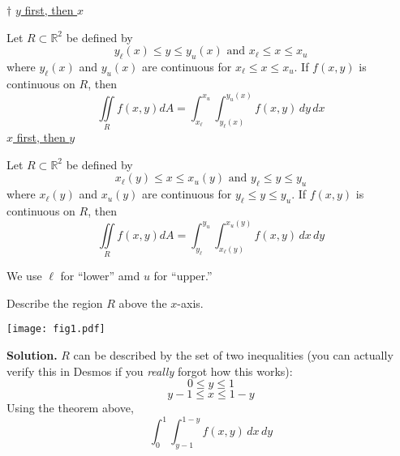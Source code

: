 \begin{Theorem}{$ \dagger $}{}
    \underline{$ y $ first, then $ x $}

    Let $ R\subset \mathbb{R}^2 $ be defined by
    \[ y_\ell(x)\leqslant y\leqslant y_u(x)\text{ and }
        x_{\ell}\leqslant x\leqslant x_u \]
    where $ y_{\ell}(x) $ and $ y_u(x) $ are continuous
    for $ x_{\ell}\leqslant x\leqslant x_u $. If $ f(x,y) $
    is continuous on $ R $, then
    \[ \iint\limits_{R}f(x,y)dA=
        \int_{x_\ell}^{x_u} \int_{y_\ell(x)}^{y_u(x)} f(x,y)\, d{y} \, d{x}  \]
    \underline{$ x $ first, then $ y $}

    Let $ R\subset \mathbb{R}^2 $ be defined by
    \[ x_\ell(y)\leqslant x\leqslant x_u(y)\text{ and }
        y_{\ell}\leqslant y\leqslant y_u \]
    where $ x_{\ell}(y) $ and $ x_u(y) $ are continuous
    for $ y_{\ell}\leqslant y\leqslant y_u $. If $ f(x,y) $
    is continuous on $ R $, then
    \[ \iint\limits_{R}f(x,y)dA=
        \int_{y_\ell}^{y_u} \int_{x_\ell(y)}^{x_u(y)} f(x,y)\, d{x} \, d{y}  \]
\end{Theorem}
We use $ \ell $ for ``lower'' amd $ u $ for ``upper.''
\begin{Example}{}{}
    Describe the region $ R $ above the $ x $-axis.
    \begin{center}
        \texttt{[image: fig1.pdf]}
    \end{center}
    \textbf{Solution.} $ R $ can be described by the set of two inequalities
    (you can actually verify this in Desmos if you \emph{really} forgot how this works):
    \[ 0\leqslant y\leqslant 1 \]
    \[ y-1\leqslant x\leqslant 1-y \]
    Using the theorem above,
    \[ \int_{0}^{1} \int_{y-1}^{1-y} f(x,y)\, d{x}\, d{y}  \]
\end{Example}
